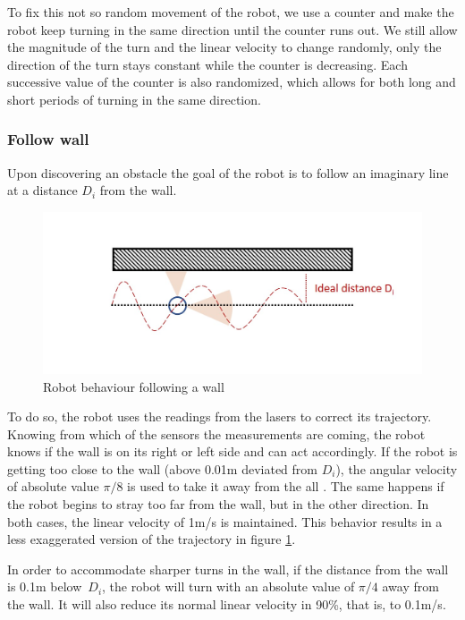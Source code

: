\documentclass[10pt,journal,compsoc]{IEEEtran}
\begin{document}
To fix this not so random movement of the robot, we use a counter and make the robot keep turning in the same direction until the counter runs out. We still allow the magnitude of the turn and the linear velocity to change randomly, only the direction of the turn stays constant while the counter is decreasing. Each successive value of the counter is also randomized, which allows for both long and short periods of turning in the same direction.

\subsubsection{Follow wall}
Upon discovering an obstacle the goal of the robot is to follow an imaginary line at a distance $D_i$ from the wall. 

\begin{figure}[thpb]
\centering
\includegraphics[scale=0.3]{img/behaviour.jpg}
\caption{Robot behaviour following a wall}
\label{fig:wall}
\end{figure}

To do so, the robot uses the readings from the lasers to correct its trajectory. Knowing from which of the sensors the measurements are coming, the robot knows if the wall is on its right or left side and can act accordingly. If the robot is getting too close to the wall (above 0.01m deviated from $D_i$), the angular velocity of absolute value $\pi/8$ is used to take it away from the all . The same happens if the robot begins to stray too far from the wall, but in the other direction. In both cases, the linear velocity of 1m/s is maintained. This behavior results in a less exaggerated version of the trajectory in figure \ref{fig:wall}.

In order to accommodate sharper turns in the wall, if the distance from the wall is 0.1m below~$D_i$, the robot will turn with an absolute value of $\pi/4$ away from the wall. It will also reduce its normal linear velocity in 90\%, that is, to 0.1m/s.
\end{document}
